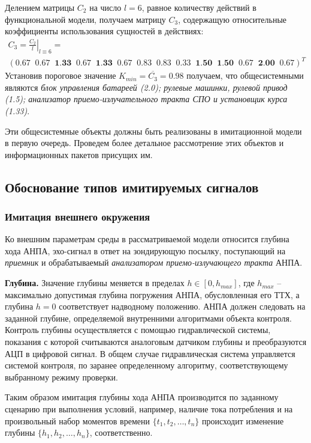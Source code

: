Делением матрицы $C_2$ на число $l = 6$, равное количеству действий в функциональной модели, получаем матрицу $C_3$,
содержащую относительные коэффициенты использования сущностей в действиях:
\begin{multline}
    C_3 = \left. \frac{C_2}{l} \right|_{l \equiv 6} = \\
        \left( 0.67\;\; 0.67\;\; \textbf{1.33}\;\; 0.67\;\; \textbf{1.33}\;\; 0.67\;\; 0.83\;\; 0.83\;\; 
        0.33\;\; \textbf{1.50}\;\;\textbf{1.50}\;\; 0.67\;\; \textbf{2.00}\;\; 0.67 \right)^T
\end{multline}
Установив пороговое значение $K_{min} = \overline{C_3} = 0.98$ получаем, что общесистемными являются
\textit{блок управления батареей (2.0);
    рулевые машинки, рулевой привод (1.5);
    анализатор приемо-излучательного тракта СПО и установщик курса (1.33)}.

Эти общесистемные объекты должны быть реализованы в имитационной модели в первую очередь.
Проведем более детальное рассмотрение этих объектов и информационных пакетов присущих им.


\subsection{Обоснование типов имитируемых сигналов}\label{sec:model_anpa_params}

\subsubsection{Имитация внешнего окружения}\label{sec:model_anpa:outer_params}
Ко внешним параметрам среды в рассматриваемой модели относится
глубина хода АНПА, эхо-сигнал в ответ на зондирующую посылку,
поступающий на \textit{приемник} и обрабатываемый \textit{анализатором приемо-излучающего тракта} АНПА.

\textbf{Глубина.}
Значение глубины меняется в пределах $h \in [0, h_{max}]$,
где $h_{max}$ -- максимально допустимая глубина погружения АНПА, обусловленная его ТТХ,
а глубина $h = 0$ соответствует надводному положению.
АНПА должен следовать на заданной глубине, определяемой внутренними алгоритмами объекта контроля.
Контроль глубины осуществляется с помощью гидравлической системы,
показания с которой считываются аналоговым датчиком глубины и преобразуются АЦП в цифровой сигнал.
В общем случае гидравлическая система управляется системой контроля,
по заранее определенному алгоритму, соответствующему выбранному режиму проверки.

Таким образом имитация глубины хода АНПА производится по заданному сценарию
при выполнения условий, например, наличие тока потребления
и на произвольный набор моментов времени $\{t_1, t_2, \ldots, t_n\}$
происходит изменение глубины $\{h_1, h_2, \ldots, h_n\}$, соответственно.



